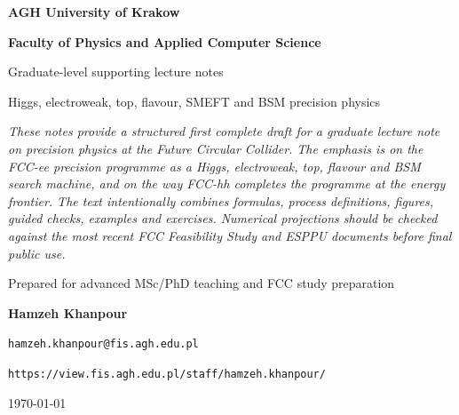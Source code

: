 \documentclass[11pt,a4paper]{article}
\numberwithin{equation}{section}
\begin{document}
\begin{titlepage}
\centering
\vspace*{1.2cm}
{\textbf{AGH University of Krakow}\par}
{\textbf{Faculty of Physics and Applied Computer Science}\par}
\vspace{1.4cm}


\vspace{1.3cm}
{\Large Graduate-level supporting lecture notes\par}
\vspace{0.35cm}
{\large Higgs, electroweak, top, flavour, SMEFT and BSM precision physics\par}
\vspace{1.2cm}

\begin{guidelinebox}
\vspace{0.25cm}
\itshape
These notes provide a structured first complete draft for a graduate lecture note on precision physics at the Future Circular Collider. The emphasis is on the FCC-ee precision programme as a Higgs, electroweak, top, flavour and BSM search machine, and on the way FCC-hh completes the programme at the energy frontier. The text intentionally combines formulas, process definitions, figures, guided checks, examples and exercises. Numerical projections should be checked against the most recent FCC Feasibility Study and ESPPU documents before final public use.
\end{guidelinebox}

\vfill
{\normalsize Prepared for advanced MSc/PhD teaching and FCC study preparation\par}
{\textbf{Hamzeh Khanpour}\par}
{\normalsize \texttt{hamzeh.khanpour@fis.agh.edu.pl}\par}
{\texttt{https://view.fis.agh.edu.pl/staff/hamzeh.khanpour/}\par}
{\normalsize \today\par}
\end{titlepage}
\end{document}
